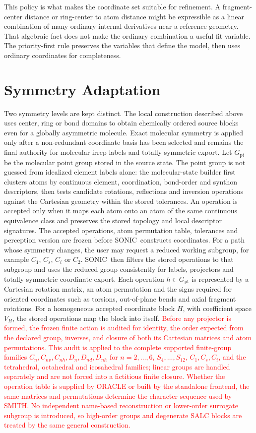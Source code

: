 \documentclass[journal=jctcce,manuscript=article,layout=traditional]{achemso}
\newcommand{\SONIC}{SONIC}
\newcommand{\SMITH}{\textsc{SMITH}}
\theoremstyle{definition}
\begin{document}
This policy is what makes the coordinate set suitable for refinement.  A
fragment-center distance or ring-center to atom distance might be expressible as
a linear combination of many ordinary internal derivatives near a reference
geometry.  That algebraic fact does not make the ordinary combination a useful
fit variable.  The priority-first rule preserves the variables that define the
model, then uses ordinary coordinates for completeness.

\section{Symmetry Adaptation}

Two symmetry levels are kept distinct.  The local construction described above
uses center, ring or bond domains to obtain chemically ordered source blocks
even for a globally asymmetric molecule.  Exact molecular symmetry is applied
only after a non-redundant coordinate basis has been selected and remains the
final authority for molecular irrep labels and totally symmetric export.  Let
\(G_{\mathrm{pt}}\) be the molecular point group stored in the
source state.  The point group is not guessed from idealized element labels
alone: the molecular-state builder first clusters atoms by continuous element,
coordination, bond-order and synthon descriptors, then tests candidate
rotations, reflections and inversion operations against the Cartesian geometry
within the stored tolerances.  An operation is accepted only when it maps each
atom onto an atom of the same continuous equivalence class and preserves the
stored topology and local descriptor signatures.  The accepted operations, atom
permutation table, tolerances and perception version are frozen before
\SONIC\ constructs coordinates.  For a path whose symmetry changes, the user
may request a reduced working subgroup, for example \(C_1\), \(C_s\), \(C_i\)
or \(C_2\).  \SONIC\ then filters the stored operations to that subgroup and
uses the reduced group consistently for labels, projectors and totally
symmetric coordinate export.  Each operation \(h\in G_{\mathrm{pt}}\) is represented by a
Cartesian rotation matrix, an atom permutation and the signs required for
oriented coordinates such as torsions, out-of-plane bends and axial fragment
rotations.  For a homogeneous accepted coordinate block \(H\), with coefficient
space \(V_H\), the stored operations map the block into itself.
\textcolor{red}{Before any projector is formed, the frozen finite action is
audited for identity, the order expected from the declared group, inverses,
and closure of both its Cartesian matrices and atom permutations.  This audit
is applied to the complete supported finite-group families
\(C_n,C_{nv},C_{nh},D_n,D_{nd},D_{nh}\) for \(n=2,\ldots,6\),
\(S_4,\ldots,S_{12}\), \(C_1,C_s,C_i\), and the tetrahedral,
octahedral and icosahedral families; linear groups are handled separately and
are not forced into a fictitious finite closure.  Whether the operation table
is supplied by ORACLE or built by the standalone frontend, the same matrices
and permutations determine the character sequence used by \SMITH.  No
independent name-based reconstruction or lower-order surrogate subgroup is
introduced, so high-order groups and degenerate SALC blocks are treated by the
same general construction.}
\end{document}
